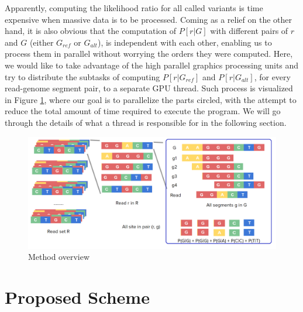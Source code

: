 \documentclass{PHlab-thesis}
\begin{document}
Apparently, computing the likelihood ratio for all called variants is time expensive when massive data is to be processed. Coming as a relief on the other hand, it is also obvious that the computation of $P[r|G]$ with different pairs of $r$ and $G$ (either $G_{ref}$ or $G_{alt}$), is independent with each other, enabling us to process them in parallel without worrying the orders they were computed. Here, we would like to take advantage of the high parallel graphics processing units and try to distribute the subtasks of computing $P[r|G_{ref}]$ and $P[r|G_{alt}]$, for every read-genome segment pair, to a separate GPU thread. Such process is visualized in Figure \ref{fig:overview}, where our goal is to parallelize the parts circled, with the attempt to reduce the total amount of time required to execute the program. We will go through the details of what a thread is responsible for in the following section.

\begin{figure}
	\centering
	\includegraphics[scale=0.3]{figures/overview.png}
	\caption{Method overview}
	\label{fig:overview} %
\end{figure}

\section{Proposed Scheme}
\end{document}
